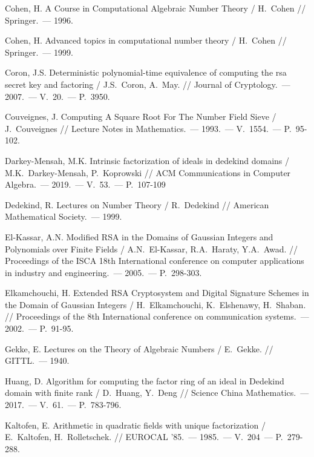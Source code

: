 \begin{thebibliography}{99}
    Cohen, H. A Course in Computational Algebraic Number Theory / H.~Cohen // Springer.~--- 1996.

    Cohen, H. Advanced topics in computational number theory / H.~Cohen // Springer.~--- 1999.

    Coron, J.S. Deterministic polynomial-time equivalence of computing the rsa secret key and factoring / J.S.~Coron, A.~May. // Journal of Cryptology.~--- 2007.~--- V.~20.~--- P.~3950.

    Couveignes, J. Computing A Square Root For The Number Field Sieve / J.~Couveignes // Lecture Notes in Mathematics.~--- 1993.~--- V.~1554.~--- P.~95-102.

    Darkey-Mensah, M.K. Intrinsic factorization of ideals in dedekind domains / M.K.~Darkey-Mensah, P.~Koprowski // ACM Communications in Computer Algebra.~--- 2019.~--- V.~53.~--- P.~107-109

    Dedekind, R. Lectures on Number Theory / R.~Dedekind // American Mathematical Society.~--- 1999.

    El-Kassar, A.N. Modified RSA in the Domains of Gaussian Integers and Polynomials over Finite Fields / A.N.~El-Kassar, R.A.~Haraty, Y.A.~Awad. // Proceedings of the ISCA 18th International conference on computer applications in industry and engineering.~--- 2005.~--- P.~298-303.

    Elkamchouchi, H. Extended RSA Cryptosystem and Digital Signature Schemes in the Domain of Gaussian Integers / H.~Elkamchouchi, K.~Elshenawy, H.~Shaban. // Proceedings of the 8th International conference on communication systems.~--- 2002.~--- P.~91-95.

    Gekke, E. Lectures on the Theory of Algebraic Numbers / E.~Gekke. // GITTL.~--- 1940.

    Huang, D. Algorithm for computing the factor ring of an ideal in Dedekind domain with finite rank / D.~Huang, Y.~Deng // Science China Mathematics.~--- 2017.~--- V.~61.~--- P.~783-796.

    Kaltofen, E. Arithmetic in quadratic fields with unique factorization / E.~Kaltofen, H.~Rolletschek. // EUROCAL '85.~--- 1985.~--- V.~204~--- P.~279-288.


\end{thebibliography}
